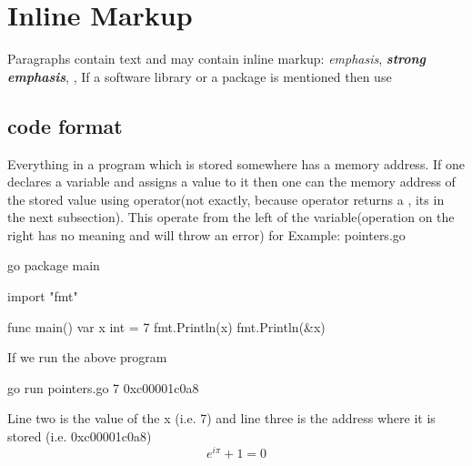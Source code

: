 \documentclass[12pt,a4paper]{report}
\begin{document}
%
\section{Inline Markup}
Paragraphs contain text and may contain inline markup: \emph{emphasis}, \emph{\bf strong emphasis}, , If a software library or a package is mentioned then use  
\subsection{code format}
Everything in a  program which is stored somewhere has a memory address. If one declares a variable and assigns a value to it then one can  the memory address of the stored value using \pre{\&} operator(not exactly, because \pre{\&} operator returns a , its in the next subsection). This operate from the left of the variable(operation on the right has no meaning and will throw an error) for Example: pointers.go
\lipsum[1]
%
\begin{code}{go}
package main

import "fmt"

func main() {
  var x int = 7
  fmt.Println(x)
  fmt.Println(&x)
}
\end{code}
%
If we run the above program 
\begin{literal}
go run pointers.go
7
0xc00001c0a8
\end{literal}
%
Line two is the value of the  x (i.e. 7) and line three is the address where it is stored (i.e. 0xc00001c0a8)
\begin{equation}
  e^{i\pi}+1=0
  \label{eqn:euler}
\end{equation}

%
%	
%	
%
\end{document}
